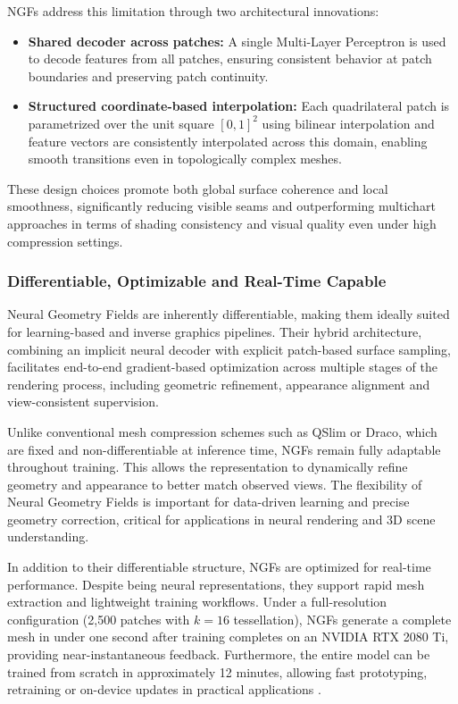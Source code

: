 NGFs address this limitation through two architectural innovations:
\begin{itemize}
    \item \textbf{Shared decoder across patches:} A single Multi-Layer Perceptron is used to decode features from all patches, ensuring consistent behavior at patch boundaries and preserving patch continuity.
    \item \textbf{Structured coordinate-based interpolation:} Each quadrilateral patch is parametrized over the unit square $[0,1]^2$ using bilinear interpolation and feature vectors are consistently interpolated across this domain, enabling smooth transitions even in topologically complex meshes.
\end{itemize}

These design choices promote both global surface coherence and local smoothness, significantly reducing visible seams and outperforming multichart approaches in terms of shading consistency and visual quality even under high compression settings.

\subsubsection{Differentiable, Optimizable and Real-Time Capable}

Neural Geometry Fields are inherently differentiable, making them ideally suited for learning-based and inverse graphics pipelines. 
Their hybrid architecture, combining an implicit neural decoder with explicit patch-based surface sampling, facilitates end-to-end gradient-based optimization across multiple stages of the rendering process, including geometric refinement, appearance alignment and view-consistent supervision. 

Unlike conventional mesh compression schemes such as QSlim or Draco, which are fixed and non-differentiable at inference time, NGFs remain fully adaptable throughout training. 
This allows the representation to dynamically refine geometry and appearance to better match observed views. 
The flexibility of Neural Geometry Fields is important for data-driven learning and precise geometry correction, critical for applications in neural rendering and 3D scene understanding. 

In addition to their differentiable structure, NGFs are optimized for real-time performance. 
Despite being neural representations, they support rapid mesh extraction and lightweight training workflows. 
Under a full-resolution configuration (2,500 patches with $k=16$ tessellation), NGFs generate a complete mesh in under one second after training completes on an NVIDIA RTX 2080 Ti, providing near-instantaneous feedback. 
Furthermore, the entire model can be trained from scratch in approximately 12 minutes, allowing fast prototyping, retraining or on-device updates in practical applications \cite{sivaram2024}. 

